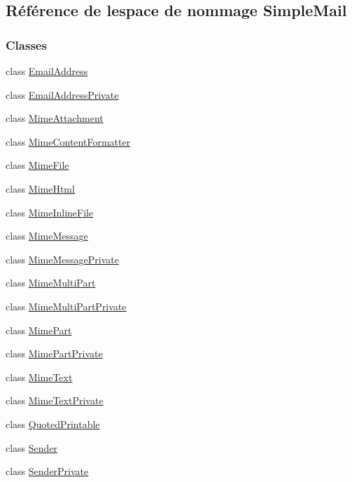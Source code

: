 \hypertarget{namespace_simple_mail}{}\subsection{Référence de l\textquotesingle{}espace de nommage Simple\+Mail}
\label{namespace_simple_mail}
\subsubsection*{Classes}
\begin{DoxyCompactItemize}
\item 
class \hyperlink{class_simple_mail_1_1_email_address}{Email\+Address}
\item 
class \hyperlink{class_simple_mail_1_1_email_address_private}{Email\+Address\+Private}
\item 
class \hyperlink{class_simple_mail_1_1_mime_attachment}{Mime\+Attachment}
\item 
class \hyperlink{class_simple_mail_1_1_mime_content_formatter}{Mime\+Content\+Formatter}
\item 
class \hyperlink{class_simple_mail_1_1_mime_file}{Mime\+File}
\item 
class \hyperlink{class_simple_mail_1_1_mime_html}{Mime\+Html}
\item 
class \hyperlink{class_simple_mail_1_1_mime_inline_file}{Mime\+Inline\+File}
\item 
class \hyperlink{class_simple_mail_1_1_mime_message}{Mime\+Message}
\item 
class \hyperlink{class_simple_mail_1_1_mime_message_private}{Mime\+Message\+Private}
\item 
class \hyperlink{class_simple_mail_1_1_mime_multi_part}{Mime\+Multi\+Part}
\item 
class \hyperlink{class_simple_mail_1_1_mime_multi_part_private}{Mime\+Multi\+Part\+Private}
\item 
class \hyperlink{class_simple_mail_1_1_mime_part}{Mime\+Part}
\item 
class \hyperlink{class_simple_mail_1_1_mime_part_private}{Mime\+Part\+Private}
\item 
class \hyperlink{class_simple_mail_1_1_mime_text}{Mime\+Text}
\item 
class \hyperlink{class_simple_mail_1_1_mime_text_private}{Mime\+Text\+Private}
\item 
class \hyperlink{class_simple_mail_1_1_quoted_printable}{Quoted\+Printable}
\item 
class \hyperlink{class_simple_mail_1_1_sender}{Sender}
\item 
class \hyperlink{class_simple_mail_1_1_sender_private}{Sender\+Private}
\end{DoxyCompactItemize}

